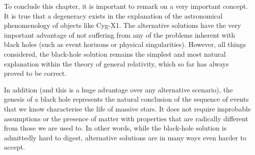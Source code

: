 To conclude this chapter, it is important to remark on a very important concept. It is
true that a degeneracy exists in the explanation of the astronomical
phenomenology of objects like Cyg-X1. The alternative solutions have the very important
advantage of not suffering from any of the problems inherent with black holes (such as
event horizons or physical singularities). However, all things considered, the
black-hole solution remains the simplest and most natural explanation within the theory
of general relativity, which so far has always proved to be correct.

In addition (and this is a huge advantage over any alternative scenario), the genesis of
a black hole represents the natural conclusion of the sequence of events that we know
characterise the life of massive stars. It does not require improbable assumptions or
the presence of matter with properties that are radically different from those we are
used to. In other words, while the black-hole solution is admittedly hard to digest,
alternative solutions are in many ways even harder to accept.
